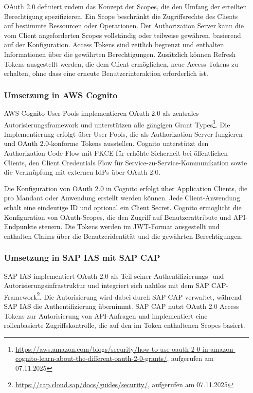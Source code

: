 OAuth 2.0 definiert zudem das Konzept der Scopes, die den Umfang der erteilten Berechtigung spezifizieren. Ein Scope beschränkt die Zugriffsrechte des Clients auf bestimmte Ressourcen oder Operationen. Der Authorization Server kann die vom Client angeforderten Scopes vollständig oder teilweise gewähren, basierend auf der Konfiguration. Access Tokens sind zeitlich begrenzt und enthalten Informationen über die gewährten Berechtigungen. Zusätzlich können Refresh Tokens ausgestellt werden, die dem Client ermöglichen, neue Access Tokens zu erhalten, ohne dass eine erneute Benutzerinteraktion erforderlich ist.

\subsubsection{Umsetzung in AWS Cognito}

AWS Cognito User Pools implementieren OAuth 2.0 als zentrales Autorisierungsframework und unterstützen alle gängigen Grant Types\footnote{\url{https://aws.amazon.com/blogs/security/how-to-use-oauth-2-0-in-amazon-cognito-learn-about-the-different-oauth-2-0-grants/}, aufgerufen am 07.11.2025}. Die Implementierung erfolgt über User Pools, die als Authorization Server fungieren und OAuth 2.0-konforme Tokens ausstellen. Cognito unterstützt den Authorization Code Flow mit \ac{PKCE} für erhöhte Sicherheit bei öffentlichen Clients, den Client Credentials Flow für Service-zu-Service-Kommunikation sowie die Verknüpfung mit externen \ac{IdP}s über OAuth 2.0.

Die Konfiguration von OAuth 2.0 in Cognito erfolgt über Application Clients, die pro Mandant oder Anwendung erstellt werden können. Jede Client-Anwendung erhält eine eindeutige ID und optional ein Client Secret. Cognito ermöglicht die Konfiguration von OAuth-Scopes, die den Zugriff auf Benutzerattribute und API-Endpunkte steuern. Die Tokens werden im \ac{JWT}-Format ausgestellt und enthalten Claims über die Benutzeridentität und die gewährten Berechtigungen.

\subsubsection{Umsetzung in SAP IAS mit SAP CAP}

\ac{SAP IAS} implementiert OAuth 2.0 als Teil seiner Authentifizierungs- und Autorisierungsinfrastruktur und integriert sich nahtlos mit dem \ac{SAP CAP}-Framework\footnote{\url{https://cap.cloud.sap/docs/guides/security/}, aufgerufen am 07.11.2025}. Die Autorisierung wird dabei durch \ac{SAP CAP} verwaltet, während \ac{SAP IAS} die Authentifizierung übernimmt. \ac{SAP CAP} nutzt OAuth 2.0 Access Tokens zur Autorisierung von API-Anfragen und implementiert eine rollenbasierte Zugriffskontrolle, die auf den im Token enthaltenen Scopes basiert.

